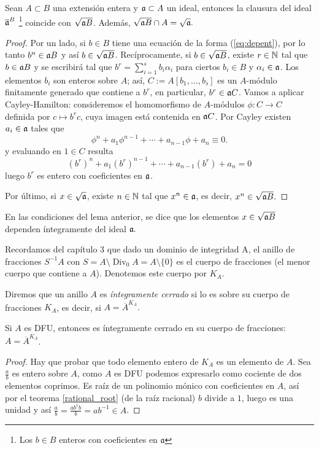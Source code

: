 \documentclass[../main.tex]{subfiles}
\begin{document}
\begin{lemma}\label{lemma:idext}
Sean $A\subset B$ una extensión entera y $\mathfrak{a}\subset A$ un ideal, entonces la clausura del ideal $\overline{\mathfrak{a}}^B$ \footnote{Los $b\in B$ enteros con coeficientes en $\mathfrak{a}$} coincide con $\sqrt{\mathfrak{a} B}$. Además, $\sqrt{\mathfrak{a} B}\cap A=\sqrt{\mathfrak{a}}.$
\end{lemma}
\begin{proof}
Por un lado, si $b\in B$ tiene una ecuación de la forma (\ref{eq:depent}), por lo tanto $b^n\in\mathfrak{a} B$ y así $b\in\sqrt{\mathfrak{a} B}$. Recíprocamente, si $b\in\sqrt{\mathfrak{a} B}$, existe $r\in\mathbb{N}$ tal que $b \in \mathfrak{a} B$ y se escribirá tal que $b^r=\sum_{i=1}^sb_i\alpha_i$ para ciertos $b_i \in B$ y $\alpha_i \in \mathfrak{a}$.
Los elementos $b_i$ son enteros sobre $A$; así, $C:=A[b_1,\dots,b_s]$ es un $A$-módulo finitamente generado que contiene a $b^r$, en particular, $b^r\in\mathfrak{a} C$. Vamos a aplicar Cayley-Hamilton: consideremos el homomorfismo de $A$-módulos $\phi: C\rightarrow C$ definida por $c\mapsto b^r c$, cuya imagen está contenida en $\mathfrak{a} C$. Por Cayley existen $a_i\in\mathfrak{a}$ tales que
$$\phi^n+a_1\phi^{n-1}+\cdots+a_{n-1}\phi+a_n\equiv 0.$$
y evaluando en $1\in C$ resulta
$$(b^r)^n+a_1(b^r)^{n-1}+\cdots+a_{n-1}(b^r)+a_n= 0$$
luego $b^r$ es entero con coeficientes en $\mathfrak{a}$.

Por último, si $x\in\sqrt{\mathfrak{a}}$, existe $n\in\mathbb{N}$ tal que $x^n\in\mathfrak{a}$, es decir, $x^n\in\sqrt{\mathfrak{a} B}.$
\end{proof}

\begin{definition}
En las condiciones del lema anterior, se dice que los elementos $x\in\sqrt{\mathfrak{a} B}$ dependen íntegramente del ideal $\mathfrak{a}.$
\end{definition}

Recordamos del capítulo 3 que dado un dominio de integridad A, el anillo de fracciones $S^{-1}A$ con $S = A \setminus \operatorname{Div}_0A = A\setminus \{0\}$ es el cuerpo de fracciones (el menor cuerpo que contiene a $A$). Denotemos este cuerpo por $K_A.$

\begin{definition}
Diremos que un anillo $A$ es \textit{íntegramente cerrado} si lo es sobre su cuerpo de fracciones $K_A$, es decir, si $A=\overline{A}^{K_A}.$
\end{definition}

\begin{lemma}
Si $A$ es DFU, entonces es íntegramente cerrado en su cuerpo de fracciones: $A=\overline{A}^{K_A}$.
\end{lemma}
\begin{proof}
Hay que probar que todo elemento entero de $K_A$ es un elemento de $A$. Sea $\frac{a}{b}$ es entero sobre $A$, como $A$ es DFU podemos expresarlo como cociente de dos elementos coprimos. Es raíz de un polinomio mónico con coeficientes en $A$, así por el teorema \ref{rational_root} (de la raíz racional) $b$ divide a $1$, luego es una unidad y así $\frac{a}{b} = \frac{ab^{1}b}{b} = ab^{-1}\in A$.
\end{proof}
\end{document}
